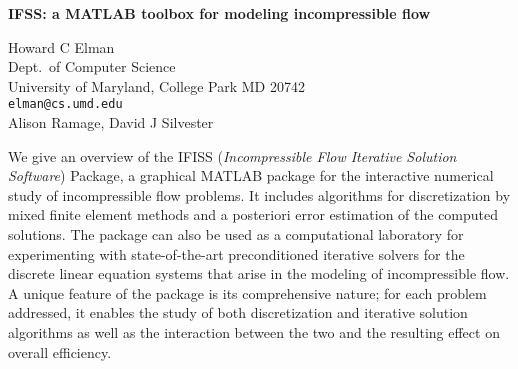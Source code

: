 \documentclass{report}
\begin{document}

\begin{center}
{\large
{\bf IFSS: a MATLAB toolbox for modeling incompressible flow}}

	Howard C Elman \\
	Dept.~of Computer Science \\
	University of Maryland, College Park MD 20742 \\
	{\tt elman@cs.umd.edu} \\
	Alison Ramage, David J Silvester
\end{center}
We give an overview of the IFISS ({\em Incompressible Flow
Iterative Solution Software}) Package, a graphical MATLAB
package for the interactive numerical study of
incompressible flow problems. It includes algorithms for
discretization by mixed finite element methods and a
posteriori error estimation of the computed solutions. The
package can also be used as a computational laboratory for
experimenting with state-of-the-art preconditioned iterative
solvers for the discrete linear equation systems that arise
in the modeling of incompressible flow. A unique feature of
the package is its comprehensive nature; for each problem
addressed, it enables the study of both discretization and
iterative solution algorithms as well as the interaction
between the two and the resulting effect on overall
efficiency.



\end{document}
